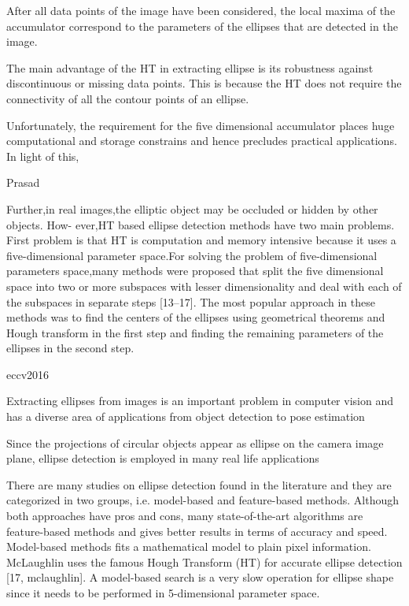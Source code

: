 \documentclass[a4paper]{report}
\begin{document}
After all data points of the image have been considered,
the local maxima of the accumulator correspond to the parameters
of the ellipses that are detected in the image.

The main advantage of the HT in extracting ellipse is its robustness
against discontinuous or missing data points. This is because
the HT does not require the connectivity of all the contour points
of an ellipse. 

Unfortunately, the requirement for the five dimensional
accumulator places huge computational and storage constrains and
hence precludes practical applications. In light of this,



Prasad

Further,in real images,the
elliptic object may be occluded or hidden by other objects.
How-
ever,HT based ellipse detection methods have two main problems.
First problem is that HT is computation and memory intensive
because it uses a five-dimensional parameter space.For solving the
problem of five-dimensional parameters space,many methods were
proposed that split the five dimensional space into two or more
subspaces with lesser dimensionality and deal with each of the
subspaces in separate steps [13–17]. The most popular approach in
these methods was to find the centers of the ellipses using
geometrical theorems and Hough transform in the first step and
finding the remaining parameters of the ellipses in the second step.


eccv2016

Extracting ellipses from images is an important problem in computer vision and
has a diverse area of applications from object detection to pose estimation

Since the projections of circular objects appear as ellipse on the
camera image plane, ellipse detection is employed in many real life applications

There are many studies on ellipse detection found in the literature and
they are categorized in two groups, i.e. model-based and feature-based methods.
Although both approaches have pros and cons, many state-of-the-art algorithms
are feature-based methods and gives better results in terms of accuracy and
speed. Model-based methods fits a mathematical model to plain pixel information.
McLaughlin uses the famous Hough Transform (HT) for accurate ellipse
detection [17, mclaughlin]. A model-based search is a very slow operation for ellipse shape
since it needs to be performed in 5-dimensional parameter space.
\end{document}
